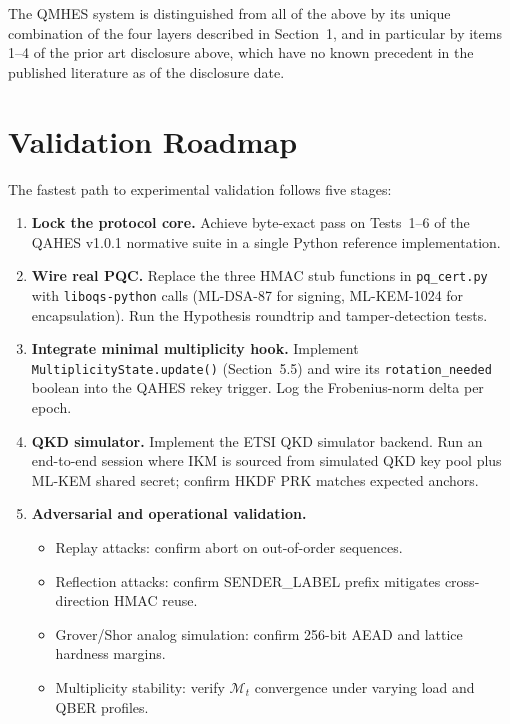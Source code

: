 \documentclass[12pt,letterpaper]{article}
\theoremstyle{plain}
\theoremstyle{definition}
\begin{document}
\noindent The QMHES system is distinguished from all of the above by its
unique combination of the four layers described in Section~1, and in
particular by items 1--4 of the prior art disclosure above, which have no
known precedent in the published literature as of the disclosure date.

\section{Validation Roadmap}
\label{sec:validation}

The fastest path to experimental validation follows five stages:

\begin{enumerate}[leftmargin=2em,label=\textbf{Stage \arabic*.}]
  \item \textbf{Lock the protocol core.} Achieve byte-exact pass on
    Tests~1--6 of the QAHES v1.0.1 normative suite in a single Python
    reference implementation.

  \item \textbf{Wire real PQC.} Replace the three HMAC stub functions in
    \texttt{pq\_cert.py} with \texttt{liboqs-python} calls (ML-DSA-87 for
    signing, ML-KEM-1024 for encapsulation). Run the Hypothesis
    roundtrip and tamper-detection tests.

  \item \textbf{Integrate minimal multiplicity hook.} Implement
    \texttt{MultiplicityState.update()} (Section~5.5) and wire its
    \texttt{rotation\_needed} boolean into the QAHES rekey trigger. Log
    the Frobenius-norm delta per epoch.

  \item \textbf{QKD simulator.} Implement the ETSI QKD simulator backend.
    Run an end-to-end session where IKM is sourced from simulated QKD key
    pool plus ML-KEM shared secret; confirm HKDF PRK matches expected
    anchors.

  \item \textbf{Adversarial and operational validation.}
    \begin{itemize}[leftmargin=1.5em]
      \item Replay attacks: confirm abort on out-of-order sequences.
      \item Reflection attacks: confirm SENDER\_LABEL prefix mitigates
        cross-direction HMAC reuse.
      \item Grover/Shor analog simulation: confirm 256-bit AEAD and
        lattice hardness margins.
      \item Multiplicity stability: verify $\mathcal{M}_t$ convergence under
        varying load and QBER profiles.
    \end{itemize}
\end{enumerate}
\end{document}
